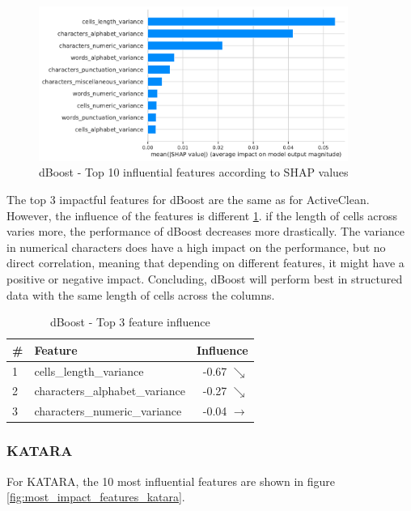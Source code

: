 \begin{figure}[H]
    \centering
    \includegraphics[width=0.9\textwidth]{thesis/Figures/RQ4/Shap_dBoost.pdf}
    \caption{dBoost - Top 10 influential features according to SHAP values}
    \label{fig:most_impact_features_dboost}
\end{figure}

The top 3 impactful features for dBoost are the same as for ActiveClean. However, the influence of the features is different \ref{tab:top_influence_features_dboost}. if the length of cells across varies more, the performance of dBoost decreases more drastically. The variance in numerical characters does have a high impact on the performance, but no direct correlation, meaning that depending on different features, it might have a positive or negative impact. 
Concluding, dBoost will perform best in structured data with the same length of cells across the columns.

\begin{table}[H]
\centering
\begin{tabular}{llr}
\toprule
 \# &                         Feature &            Influence \\
\midrule
 1 &         cells\_length\_variance &     -0.67 $\searrow$ \\
 2 &  characters\_alphabet\_variance &     -0.27 $\searrow$ \\
 3 &   characters\_numeric\_variance &  -0.04 $\rightarrow$ \\
\bottomrule
\end{tabular}
\caption{dBoost - Top 3 feature influence}
\label{tab:top_influence_features_dboost}
\end{table}


\subsubsection{KATARA}
For KATARA, the 10 most influential features are shown in figure \ref{fig:most_impact_features_katara}.

